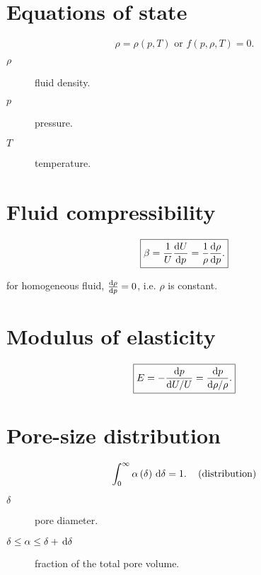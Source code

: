\documentclass[
paper=a5paper,
fontsize=15]{scrreport}
\begin{document}
\section{Equations of state}

\begin{equation*}
\boxed{
	\rho=\rho\left(p, T\right)\text{ or }f\left(p, \rho, T\right)=0.
}
\end{equation*}

\begin{multicols}{3}
\begin{description}
	\item[$\rho$] fluid density.
	\item[$p$] pressure.
	\item[$T$] temperature.
\end{description}
\end{multicols}

\section{Fluid compressibility}

\begin{equation*}
\boxed{
\beta = \frac{1}{U}\diff{U}{p}=\frac{1}{\rho}\diff{\rho}{p}.
}
\end{equation*}

for homogeneous fluid, $\diff{\rho}{p}=0$, i.e. $\rho$ is constant.

\section{Modulus of elasticity}

\begin{equation*}
\boxed{
E = -\diff{p}{U/U} = \diff{p}{\rho/\rho}.
}
\end{equation*}

\section{Pore-size distribution}


\begin{equation*}
\int_{0}^{\infty}\alpha\left(\delta\right)\dl\delta=1.
\quad\left(\text{distribution}\right)
\end{equation*}

\begin{description}
	\item[$\delta$] pore diameter.
	\item[$\delta\leq\alpha\leq\delta+\dl\delta$] fraction of the total pore volume.
\end{description}
\end{document}
